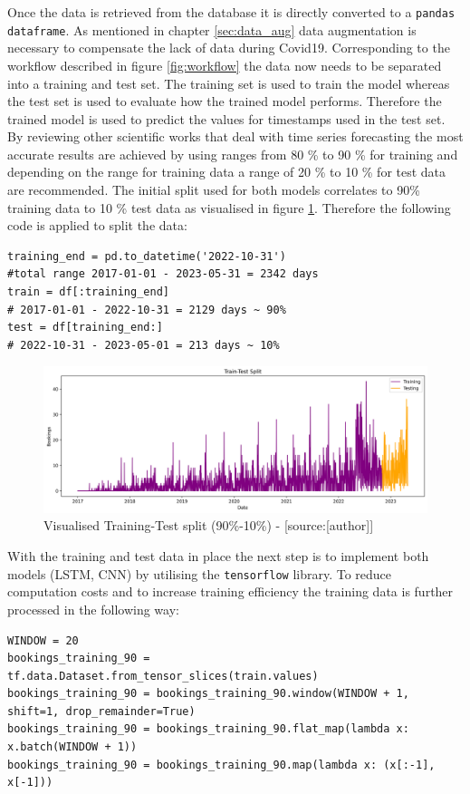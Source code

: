 Once the data is retrieved from the database it is directly converted to a \verb|pandas dataframe|. As mentioned in chapter \ref{sec:data_aug} data augmentation is necessary to compensate the lack of data during Covid19. Corresponding to the workflow described in figure \ref{fig:workflow} the data now needs to be separated into a training and test set. The training set is used to train the model whereas the test set is used to evaluate how the trained model performs. Therefore the trained model is used to predict the values for timestamps used in the test set. By reviewing other scientific works that deal with time series forecasting \cite{1d_cnn}\cite{cnn_vechicle}\cite{cnn_intro}\cite{lstm_overcome_rnn_problem}\cite{lstm_module}\cite{lstm_stock} the most accurate results are achieved by using ranges from 80 \% to 90 \% for training and depending on the range for training data a range of 20 \% to 10 \% for test data are recommended. The initial split used for both models correlates to 90\% training data to 10 \% test data as visualised in figure \ref{fig:training_test}. Therefore the following code is applied to split the data:
\begin{lstlisting}
training_end = pd.to_datetime('2022-10-31')
#total range 2017-01-01 - 2023-05-31 = 2342 days
train = df[:training_end]
# 2017-01-01 - 2022-10-31 = 2129 days ~ 90%
test = df[training_end:]
# 2022-10-31 - 2023-05-01 = 213 days ~ 10%
\end{lstlisting}
\begin{figure}[H]
	\centering
		\includegraphics[width=14cm]{images/training_test}
	\caption{Visualised Training-Test split (90\%-10\%) - [source:[author]]}
	\label{fig:training_test}
\end{figure}
With the training and test data in place the next step is to implement both models (LSTM, CNN) by utilising the \verb|tensorflow| library. To reduce computation costs and to increase training efficiency the training data is further processed in the following way:
\begin{lstlisting}
WINDOW = 20
bookings_training_90 = tf.data.Dataset.from_tensor_slices(train.values)
bookings_training_90 = bookings_training_90.window(WINDOW + 1, shift=1, drop_remainder=True)
bookings_training_90 = bookings_training_90.flat_map(lambda x: x.batch(WINDOW + 1))
bookings_training_90 = bookings_training_90.map(lambda x: (x[:-1], x[-1]))
\end{lstlisting}
